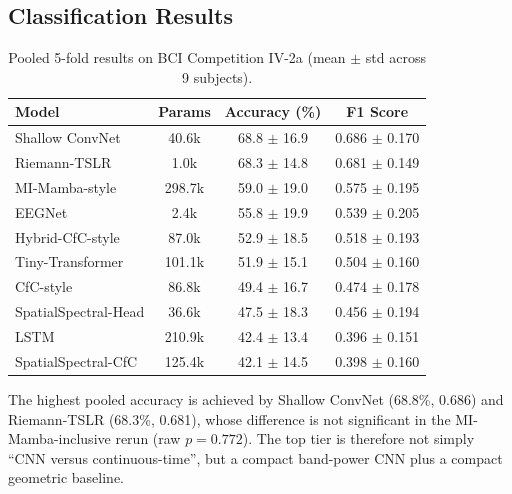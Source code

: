\documentclass[journal]{IEEEtran}
\begin{document}
\subsection{Classification Results}
\begin{table}[t]
  \centering
  \footnotesize
  \caption{Pooled 5-fold results on BCI Competition IV-2a (mean $\pm$ std across 9 subjects).}
  \begin{tabular}{lccc}
    \toprule
    \textbf{Model} & \textbf{Params} & \textbf{Accuracy (\%)} & \textbf{F1 Score} \\
    \midrule
    Shallow ConvNet \cite{schirrmeister2017deep} & 40.6k & 68.8 $\pm$ 16.9 & 0.686 $\pm$ 0.170 \\
    Riemann-TSLR & 1.0k & 68.3 $\pm$ 14.8 & 0.681 $\pm$ 0.149 \\
    MI-Mamba-style & 298.7k & 59.0 $\pm$ 19.0 & 0.575 $\pm$ 0.195 \\
    EEGNet \cite{lawhern2018eegnet} & 2.4k & 55.8 $\pm$ 19.9 & 0.539 $\pm$ 0.205 \\
    Hybrid-CfC-style & 87.0k & 52.9 $\pm$ 18.5 & 0.518 $\pm$ 0.193 \\
    Tiny-Transformer & 101.1k & 51.9 $\pm$ 15.1 & 0.504 $\pm$ 0.160 \\
    CfC-style & 86.8k & 49.4 $\pm$ 16.7 & 0.474 $\pm$ 0.178 \\
    SpatialSpectral-Head & 36.6k & 47.5 $\pm$ 18.3 & 0.456 $\pm$ 0.194 \\
    LSTM \cite{hochreiter1997long} & 210.9k & 42.4 $\pm$ 13.4 & 0.396 $\pm$ 0.151 \\
    SpatialSpectral-CfC & 125.4k & 42.1 $\pm$ 14.5 & 0.398 $\pm$ 0.160 \\
    \bottomrule
  \end{tabular}
  \label{tab:results}
\end{table}

The highest pooled accuracy is achieved by Shallow ConvNet (68.8\%, 0.686) and Riemann-TSLR (68.3\%, 0.681), whose difference is not significant in the MI-Mamba-inclusive rerun (raw $p = 0.772$). The top tier is therefore not simply ``CNN versus continuous-time'', but a compact band-power CNN plus a compact geometric baseline.
\end{document}
